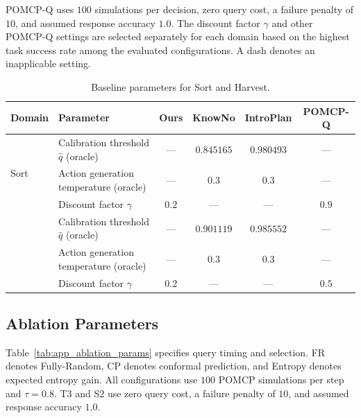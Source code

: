 POMCP-Q uses $100$ simulations per decision, zero query cost, a failure penalty of $10$, and assumed response accuracy $1.0$. The discount factor $\gamma$ and other POMCP-Q settings are selected separately for each domain based on the highest task success rate among the evaluated configurations. A dash denotes an inapplicable setting.

\begin{table}[!htbp]
\centering
\caption{Baseline parameters for Sort and Harvest.}
\label{tab:app_baseline_params}
\footnotesize
\setlength{\tabcolsep}{2pt}
\renewcommand{\arraystretch}{1.05}
\setlength{\extrarowheight}{0pt}
\begin{tabular*}{\textwidth}{@{\extracolsep{\fill}}llcccc@{}}
\toprule
Domain & Parameter & \textbf{Ours} & KnowNo & IntroPlan & POMCP-Q \\
\midrule
\multirow{3}{*}{Sort} & Calibration threshold $\hat{q}$ (oracle) & --- & $0.845165$ & $0.980493$ & --- \\
 & Action generation temperature (oracle) & --- & $0.3$ & $0.3$ & --- \\
 & Discount factor $\gamma$ & $0.2$ & --- & --- & $0.9$ \\
\addlinespace[3pt]
\multirow{3}{*}{Harvest} & Calibration threshold $\hat{q}$ (oracle) & --- & $0.901119$ & $0.985552$ & --- \\
 & Action generation temperature (oracle) & --- & $0.3$ & $0.3$ & --- \\
 & Discount factor $\gamma$ & $0.2$ & --- & --- & $0.5$ \\
\bottomrule
\end{tabular*}
\end{table}

\clearpage
\subsection{Ablation Parameters}\label{appx:ablation_configs}
Table~\ref{tab:app_ablation_params} specifies query timing and selection. FR denotes Fully-Random, CP denotes conformal prediction, and Entropy denotes expected entropy gain. All configurations use $100$ POMCP simulations per step and $\tau=0.8$. T3 and S2 use zero query cost, a failure penalty of $10$, and assumed response accuracy $1.0$.

